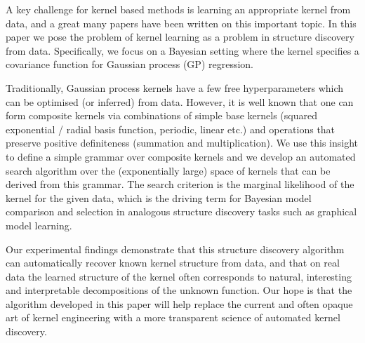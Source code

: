\documentclass[twoside]{article}
\begin{document}
A key challenge for kernel based methods is learning an appropriate kernel from data, and a great many papers have been written on this important topic.
In this paper we pose the problem of kernel learning as a problem in structure discovery from data.
Specifically, we focus on a Bayesian setting where the kernel specifies a covariance function for Gaussian process (GP) regression.

Traditionally, Gaussian process kernels have a few free hyperparameters which can be optimised (or inferred) from data.
However, it is well known that one can form composite kernels via combinations of simple base kernels (\eg squared exponential / radial basis function, periodic, linear etc.) and operations that preserve positive definiteness (\eg summation and multiplication).
We use this insight to define a simple grammar over composite kernels and we develop an automated search algorithm over the (exponentially large) space of kernels that can be derived from this grammar.
The search criterion is the marginal likelihood of the kernel for the given data, which is the driving term for Bayesian model comparison and selection in analogous structure discovery tasks such as graphical model learning.

Our experimental findings demonstrate that this structure discovery algorithm can automatically recover known kernel structure from data, and that on real data the learned structure of the kernel often corresponds to natural, interesting and interpretable decompositions of the unknown function.
Our hope is that the algorithm developed in this paper will help replace the current and often opaque art of kernel engineering with a more transparent science of automated kernel discovery.


\end{document}

